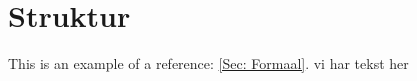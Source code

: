 \section*{Struktur} \label{Sec: Struktur}

	This is an example of a reference: \cref{Sec: Formaal}.
	vi har tekst her
